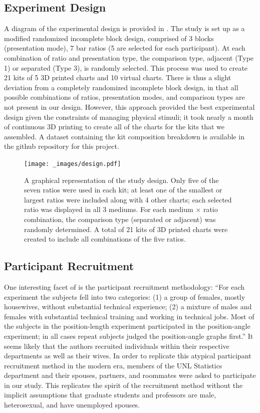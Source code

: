 \documentclass[letterpaper,inpress,dvipsnames]{jdsart}
\begin{document}
\hypertarget{experiment-design}{%
\subsection{Experiment Design}\label{experiment-design}}

A diagram of the experimental design is provided in . The study is set up as a modified randomized incomplete block design, comprised of 3 blocks (presentation mode), 7 bar ratios (5 are selected for each participant). At each combination of ratio and presentation type, the comparison type, adjacent (Type 1) or separated (Type 3), is randomly selected. This process was used to create 21 kits of 5 3D printed charts and 10 virtual charts. There is thus a slight deviation from a completely randomized incomplete block design, in that all possible combinations of ratios, presentation modes, and comparison types are not present in our design. However, this approach provided the best experimental design given the constraints of managing physical stimuli; it took nearly a month of continuous 3D printing to create all of the charts for the kits that we assembled. A dataset containing the kit composition breakdown is available in the github repository for this project.

\begin{figure}
\centering
\texttt{[image: \_images/design.pdf]}
\caption{\label{fig:studyDesign}A graphical representation of the study design. Only five of the seven ratios were used in each kit; at least one of the smallest or largest ratios were included along with 4 other charts; each selected ratio was displayed in all 3 mediums. For each medium \(\times\) ratio combination, the comparison type (separated or adjacent) was randomly determined. A total of 21 kits of 3D printed charts were created to include all combinations of the five ratios.}
\end{figure}

\hypertarget{participant-recruitment}{%
\subsection{Participant Recruitment}\label{participant-recruitment}}

One interesting facet of \citet{clevelandGraphical1984} is the participant recruitment methodology: ``For each experiment the subjects fell into two categories: (1) a group of females, mostly housewives, without substantial technical experience; (2) a mixture of males and females with substantial technical training and working in technical jobs.
Most of the subjects in the position-length experiment participated in the position-angle experiment; in all cases repeat subjects judged the position-angle graphs first.''
It seems likely that the authors recruited individuals within their respective departments as well as their wives.
In order to replicate this atypical participant recruitment method in the modern era, members of the UNL Statistics department and their spouses, partners, and roommates were asked to participate in our study.
This replicates the spirit of the recruitment method without the implicit assumptions that graduate students and professors are male, heterosexual, and have unemployed spouses.
\end{document}
